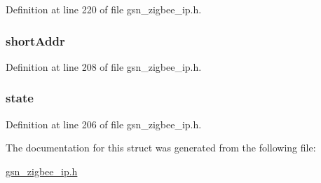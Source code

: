 Definition at line 220 of file gsn\_\-zigbee\_\-ip.h.

\hypertarget{a00440_a9b19e8e3387061f7498579b37cdbabdf}{
\subsubsection[{shortAddr}]{ {\bf shortAddr}}}
\label{a00440_a9b19e8e3387061f7498579b37cdbabdf}


Definition at line 208 of file gsn\_\-zigbee\_\-ip.h.

\hypertarget{a00440_a6e9c4cbd32a1178b12f3a61f6855c896}{
\subsubsection[{state}]{ {\bf state}}}
\label{a00440_a6e9c4cbd32a1178b12f3a61f6855c896}


Definition at line 206 of file gsn\_\-zigbee\_\-ip.h.



The documentation for this struct was generated from the following file:\begin{DoxyCompactItemize}
\item 
\hyperlink{a00618}{gsn\_\-zigbee\_\-ip.h}\end{DoxyCompactItemize}
